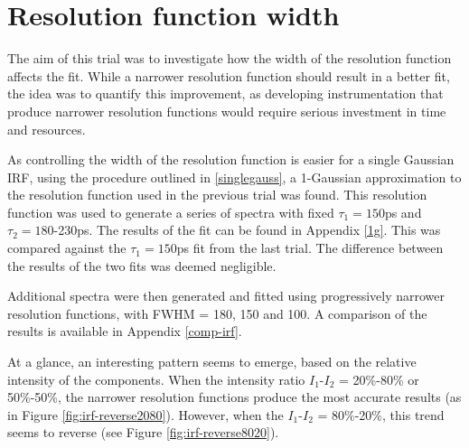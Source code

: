 \vspace{0.5cm}

\section{Resolution function width}

The aim of this trial was to investigate how the width of the resolution function affects the fit. While a narrower resolution function should result in a better fit, the idea was to quantify this improvement, as developing instrumentation that produce narrower resolution functions would require serious investment in time and resources.

As controlling the width of the resolution function is easier for a single Gaussian IRF, using the procedure outlined in \ref{singlegauss}, a 1-Gaussian approximation to the resolution function used in the previous trial was found. This resolution function was used to generate a series of spectra with fixed $\tau_1=150$ps and $\tau_2=180$-230ps. The results of the fit can be found in Appendix \ref{1g}. This was compared against the $\tau_1=150$ps fit from the last trial. The difference between the results of the two fits was deemed negligible.

Additional spectra were then generated and fitted using progressively narrower resolution functions, with FWHM = 180, 150 and 100. A comparison of the results is available in Appendix \ref{comp-irf}.

At a glance, an interesting pattern seems to emerge, based on the relative intensity of the components. When the intensity ratio $I_1$-$I_2$ = 20\%-80\% or 50\%-50\%, the narrower resolution functions produce the most accurate results (as in Figure \ref{fig:irf-reverse2080}). However, when the $I_1$-$I_2$ = 80\%-20\%, this trend seems to reverse (see Figure \ref{fig:irf-reverse8020}).

 

